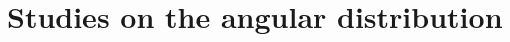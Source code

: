 \chapter{Studies on the \texorpdfstring{\lambdadecay}{Lambda baryon decay} angular distribution}
\label{cap:angular_distribution}

